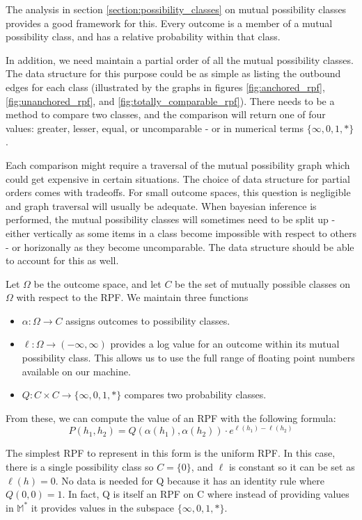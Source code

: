 \documentclass[twoside]{article}
\theoremstyle{plain}%
\theoremstyle{definition}
\theoremstyle{remark}
\begin{document}
The analysis in section \ref{section:possibility_classes} on mutual possibility classes provides a good framework for this. Every outcome is a member of a mutual possibility class, and has a relative probability within that class.

In addition, we need maintain a partial order of all the mutual possibility classes. The data structure for this purpose could be as simple as listing the outbound edges for each class (illustrated by the graphs in figures \ref{fig:anchored_rpf}, \ref{fig:unanchored_rpf}, and \ref{fig:totally_comparable_rpf}). There needs to be a method to compare two classes, and the comparison will return one of four values: greater, lesser, equal, or uncomparable - or in numerical terms \(\{\infty, 0, 1, \ast\}\).

Each comparison might require a traversal of the mutual possibility graph which could get expensive in certain situations. The choice of data structure for partial orders comes with tradeoffs. For small outcome spaces, this question is negligible and graph traversal will usually be adequate. When bayesian inference is performed, the mutual possibility classes will sometimes need to be split up - either vertically as some items in a class become impossible with respect to others - or horizonally as they become uncomparable. The data structure should be able to account for this as well.

Let \(\Omega\) be the outcome space, and let \(C\) be the set of mutually possible classes on \(\Omega\) with respect to the RPF. We maintain three functions 

\begin{itemize}
\item \(\alpha: \Omega \rightarrow C\) assigns outcomes to possibility classes.
\item \(\ell: \Omega \rightarrow (-\infty, \infty)\) provides a log value for an outcome within its mutual possibility class. This allows us to use the full range of floating point numbers available on our machine.
\item \(Q: C \times C \rightarrow \{\infty, 0, 1, \ast\}\) compares two probability classes.
\end{itemize}

From these, we can compute the value of an RPF with the following formula:
\[P(h_1, h_2) = Q(\alpha(h_1), \alpha(h_2)) \cdot e^{\ell(h_1) - \ell(h_2)}\]

The simplest RPF to represent in this form is the uniform RPF. In this case, there is a single possibility class so \(C = \{0\}\), and \(\ell\) is constant so it can be set as \(\ell(h) = 0\). No data is needed for Q because it has an identity rule where \(Q(0, 0) = 1\). In fact, Q is itself an RPF on C where instead of providing values in \(\mathbb{M}^{\ast}\) it provides values in the subspace \(\{\infty, 0, 1, \ast\}\).
\end{document}
